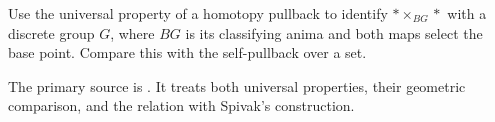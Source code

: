 \begin{exercise}
Use the universal property of a homotopy pullback to identify
$*\times_{BG}*$ with a discrete group $G$, where $BG$ is its
classifying anima and both maps select the base point.
Compare this with the self-pullback over a set.
\end{exercise}

The primary source is
\cite[Definition~2.1, Theorem~3.22, Remark~3.26,
and Section~5]{Carchedi_Steffens_Universal_Derived_Manifolds}.
It treats both universal properties, their geometric comparison, and
the relation with Spivak's construction.
